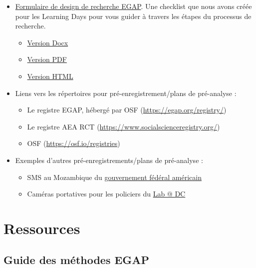 \documentclass[
  12pt,
]{book}
\begin{document}
\begin{itemize}
\item
  \href{https://egap.github.io/learningdays-resources/Exercises/design-form.html}{Formulaire de design de recherche EGAP}. Une checklist que nous avons créée pour les Learning Days pour vous guider à travers les étapes du processus de recherche.

  \begin{itemize}
  \item
    \href{https://egap.github.io/learningdays-resources/Exercises/design-form.docx}{Version Docx}
  \item
    \href{https://egap.github.io/learningdays-resources/Exercises/design-form.pdf}{Version PDF}
  \item
    \href{https://egap.github.io/learningdays-resources/Exercises/design-form.html}{Version HTML}
  \end{itemize}
\item
  Liens vers les répertoires pour pré-enregistrement/plans de pré-analyse :

  \begin{itemize}
  \item
    Le registre EGAP, hébergé par OSF (\url{https://egap.org/registry/})
  \item
    Le registre AEA RCT (\url{https://www.socialscienceregistry.org/})
  \item
    OSF (\url{https://osf.io/registries})
  \end{itemize}
\item
  Exemples d'autres pré-enregistrements/plans de pré-analyse :

  \begin{itemize}
  \item
    SMS au Mozambique du \href{https://oes.gsa.gov/projects/sms-mozambique/}{gouvernement fédéral américain}
  \item
    Caméras portatives pour les policiers du \href{https://osf.io/472zh}{Lab @ DC}
  \end{itemize}
\end{itemize}

\hypertarget{ressources}{%
\section{Ressources}\label{ressources}}

\hypertarget{guide-des-muxe9thodes-egap}{%
\subsection{Guide des méthodes EGAP}\label{guide-des-muxe9thodes-egap}}
\end{document}
